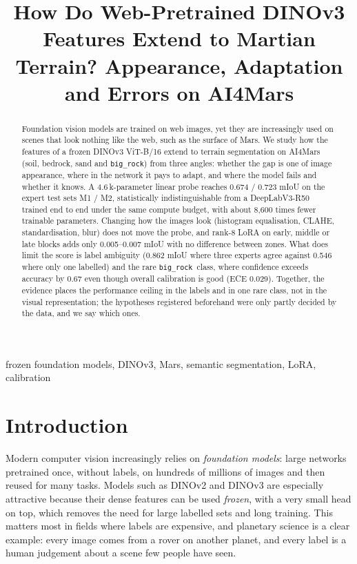 \documentclass[conference]{IEEEtran}
\title{How Do Web-Pretrained DINOv3 Features Extend to Martian Terrain? Appearance, Adaptation and Errors on AI4Mars}
\author{\IEEEauthorblockN{Authors to be added}\IEEEauthorblockA{Affiliation to be added}}
\newcommand{\bigrock}{\texttt{big\_rock}}
\begin{document}
\maketitle
\begin{abstract}
Foundation vision models are trained on web images, yet they are increasingly used on scenes that look nothing like the web, such as the surface of Mars. We study how the features of a frozen DINOv3 ViT-B/16 extend to terrain segmentation on AI4Mars (soil, bedrock, sand and \bigrock) from three angles: whether the gap is one of image appearance, where in the network it pays to adapt, and where the model fails and whether it knows. A 4.6\,k-parameter linear probe reaches 0.674 / 0.723 mIoU on the expert test sets M1 / M2, statistically indistinguishable from a DeepLabV3-R50 trained end to end under the same compute budget, with about 8{,}600 times fewer trainable parameters. Changing how the images look (histogram equalisation, CLAHE, standardisation, blur) does not move the probe, and rank-8 LoRA on early, middle or late blocks adds only 0.005--0.007 mIoU with no difference between zones. What does limit the score is label ambiguity (0.862 mIoU where three experts agree against 0.546 where only one labelled) and the rare \bigrock\ class, where confidence exceeds accuracy by 0.67 even though overall calibration is good (ECE 0.029). Together, the evidence places the performance ceiling in the labels and in one rare class, not in the visual representation; the hypotheses registered beforehand were only partly decided by the data, and we say which ones.
\end{abstract}

\begin{IEEEkeywords}frozen foundation models, DINOv3, Mars, semantic segmentation, LoRA, calibration\end{IEEEkeywords}
\section{Introduction}
Modern computer vision increasingly relies on \emph{foundation models}: large networks pretrained once, without labels, on hundreds of millions of images and then reused for many tasks. Models such as DINOv2 and DINOv3 \cite{oquab2023dinov2,simeoni2025dinov3} are especially attractive because their dense features can be used \emph{frozen}, with a very small head on top, which removes the need for large labelled sets and long training. This matters most in fields where labels are expensive, and planetary science is a clear example: every image comes from a rover on another planet, and every label is a human judgement about a scene few people have seen.
\end{document}
